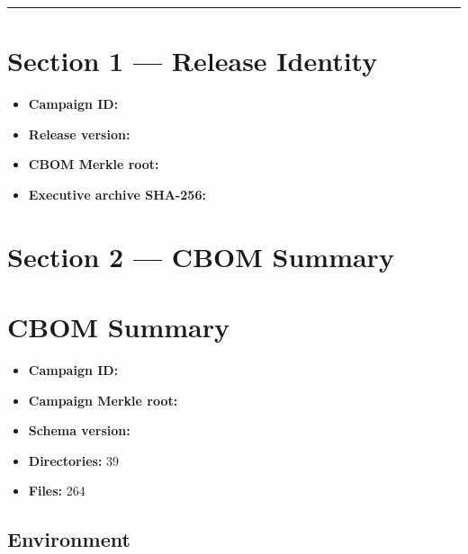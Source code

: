 \documentclass[11pt,a4paper]{article}
\providecommand{\tightlist}{\setlength{\itemsep}{0pt}\setlength{\parskip}{0pt}}
\begin{document}
\vspace{2mm}
\hrule
\vspace{4mm}

\hypertarget{section-1--release-identity}{%
\section{Section 1 --- Release Identity}\label{section-1--release-identity}}

\begin{itemize}
\tightlist
\item
  \textbf{Campaign ID:} \texttt{}
\item
  \textbf{Release version:} \texttt{}
\item
  \textbf{CBOM Merkle root:}
  \texttt{}
\item
  \textbf{Executive archive SHA-256:}
  \texttt{}
\end{itemize}

\hypertarget{section-2--cbom-summary}{%
\section{Section 2 --- CBOM Summary}\label{section-2--cbom-summary}}

\hypertarget{cbom-summary}{%
\section{CBOM Summary}\label{cbom-summary}}

\begin{itemize}
\tightlist
\item
  \textbf{Campaign ID:} \texttt{}
\item
  \textbf{Campaign Merkle root:}
  \texttt{}
\item
  \textbf{Schema version:} \texttt{}
\item
  \textbf{Directories:} 39
\item
  \textbf{Files:} 264
\end{itemize}

\hypertarget{environment}{%
\subsection{Environment}\label{environment}}
\end{document}
